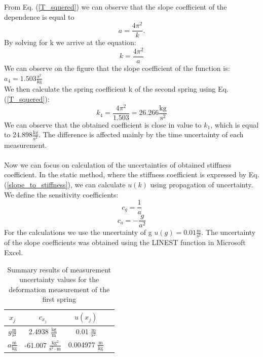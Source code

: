 \documentclass[a4paper,12pt,titlepage,bibliography=numbered]{article}
\begin{document}
\noindent From Eq. (\ref{T_squered}) we can observe that the slope coefficient of the dependence is equal to
\begin{equation}
a = \frac{4 \pi ^2}{k}.    
\end{equation}
By solving for k we arrive at the equation:
\begin{equation}
    k = \frac{4 \pi ^2}{a}
    \label{k_with_pi}
\end{equation}
We can observe on the figure that the slope coefficient of the function is: \(a_4 = 1.503 \mathrm{\frac{s^2}{kg}}\) \\ 
We then calculate the spring coefficient k of the second spring using Eq. (\ref{T_squered}): \\
\begin{equation}
    k_4 = \frac{4 \pi ^2}{1.503} = 26.266 \mathrm{\frac{kg}{s^2}}
\end{equation}
We can observe that the obtained coefficient is close in value to \(k_1\), which is equal to \(24.898 \mathrm{\frac{kg}{s^2}}\). The difference is affected mainly by the time uncertainty of each measurement.\\\\
Now we can focus on calculation of the uncertainties of obtained stiffness coefficient. In the static method, where the stiffness coefficient is expressed by Eq. (\ref{slope_to_stiffness}), we can calculate $u(k)$ using propagation of uncertainty. \\
We define the sensitivity coefficients:
\begin{equation}
    c_g = \frac{1}{a}
\end{equation}
\begin{equation}
    c_a = -\frac{g}{a^2}
\end{equation}
For the calculations we use the uncertainty of g \(u(g) = 0.01 \mathrm{\frac{m}{s^2}}\). The uncertainty of the slope coefficients was obtained using the LINEST function in Microsoft Excel.
\begin{table}[H]
\centering
\caption{Summary results of measurement uncertainty values for the deformation measurement of the first spring}
\begin{tabular}{|c|c|c|c|}
\hline
\textbf{\(x_j\)} & \textbf{\(c_{x_j}\)} & \textbf{\(u(x_j)\)} \\ \hline
\(g \mathrm{\frac{m}{s^2}}\) & 2.4938 \(\mathrm{\frac{kg}{m}}\) & 0.01 \(\mathrm{\frac{m}{s^2}}\) \\ \hline
\(a \mathrm{\frac{m}{kg}}\) & -61.007 \(\mathrm{\frac{kg^2}{s^2 \cdot m}}\) & 0.004977 \(\mathrm{\frac{m}{kg}}\) \\ \hline
\end{tabular}
\end{table}
\end{document}
